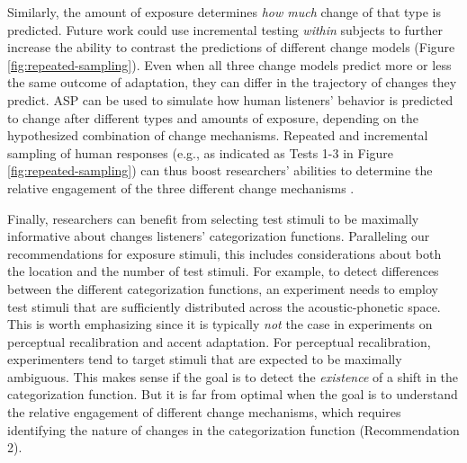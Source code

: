 \documentclass[
  11pt,
  man,floatsintext]{apa6}
\begin{document}
Similarly, the amount of exposure determines \emph{how much} change of that type is predicted.
Future work could use incremental testing \emph{within} subjects to further increase the ability to contrast the predictions of different change models (Figure \ref{fig:repeated-sampling}). Even when all three change models predict more or less the same outcome of adaptation, they can differ in the trajectory of changes they predict. ASP can be used to simulate how human listeners' behavior is predicted to change after different types and amounts of exposure, depending on the hypothesized combination of change mechanisms. Repeated and incremental sampling of human responses (e.g., as indicated as Tests 1-3 in Figure \ref{fig:repeated-sampling}) can thus boost researchers' abilities to determine the relative engagement of the three different change mechanisms \autocites[for initial efforts to implement repeated testing, see][]{tan2022,xie-kurumada2023}.

Finally, researchers can benefit from selecting test stimuli to be maximally informative about changes listeners' categorization functions. Paralleling our recommendations for exposure stimuli, this includes considerations about both the location and the number of test stimuli. For example, to detect differences between the different categorization functions, an experiment needs to employ test stimuli that are sufficiently distributed across the acoustic-phonetic space. This is worth emphasizing since it is typically \emph{not} the case in experiments on perceptual recalibration and accent adaptation. For perceptual recalibration, experimenters tend to target stimuli that are expected to be maximally ambiguous. This makes sense if the goal is to detect the \emph{existence} of a shift in the categorization function. But it is far from optimal when the goal is to understand the relative engagement of different change mechanisms, which requires identifying the nature of changes in the categorization function (Recommendation 2).
\end{document}
